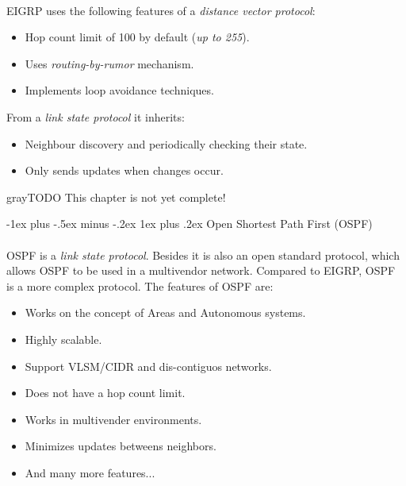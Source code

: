 \documentclass[10pt,landscape]{article}
\makeatletter
\renewcommand{\subsubsection}{\@startsection{subsubsection}{3}{0mm}%
                                {-1ex plus -.5ex minus -.2ex}%
                                {1ex plus .2ex}%
                                {\normalfont\small\bfseries}}
\makeatother
\begin{document}
\begin{multicols}{3}
\paragraph{}
EIGRP uses the following features of a \textit{distance vector protocol}:
\begin{itemize}
	\item Hop count limit of 100 by default (\textit{up to 255}).
	\item Uses \textit{routing-by-rumor} mechanism.
	\item Implements loop avoidance techniques.
\end{itemize}
From a \textit{link state protocol} it inherits:
\begin{itemize}
	\item Neighbour discovery and periodically checking their state.
	\item Only sends updates when changes occur.
\end{itemize}
\begin{textbox}{gray}{TODO}
	This chapter is not yet complete!
\end{textbox}

\subsubsection{Open Shortest Path First (OSPF)}
\paragraph{}
OSPF is a \textit{link state protocol}. Besides it is also an open standard protocol, which allows OSPF to be used in a multivendor network.
Compared to EIGRP, OSPF is a more complex protocol. The features of OSPF are:
\begin{itemize}
	\item Works on the concept of Areas and Autonomous systems.
	\item Highly scalable.
	\item Support VLSM/CIDR and dis-contiguos networks.
	\item Does not have a hop count limit.
	\item Works in multivender environments.
	\item Minimizes updates betweens neighbors.
	\item And many more features...
\end{itemize}

\end{multicols}
\end{document}
